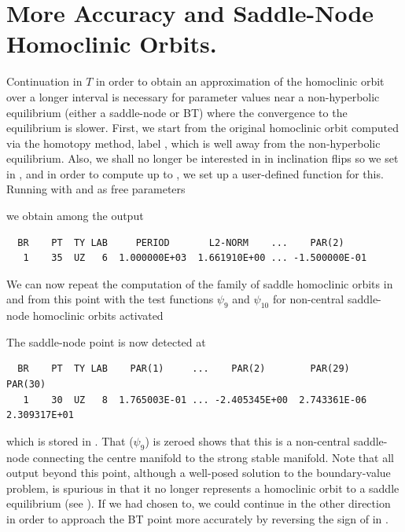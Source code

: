 \documentclass[12pt]{report}
\begin{document}
\section{More Accuracy and Saddle-Node Homoclinic Orbits.}
Continuation in $T$ 
in order to obtain an approximation of the homoclinic orbit over a
longer interval is necessary for parameter values near a non-hyperbolic
equilibrium (either a saddle-node or BT) where the convergence
to the equilibrium is slower. 
First, we start from the original homoclinic orbit computed
via the homotopy method, label , which is well away from
the non-hyperbolic equilibrium.
Also, we shall no longer be interested in
in inclination flips so we set  in ,
and in order to compute up to , we set up a
user-defined function for this. Running \AUTO with  and 
 as free parameters
\begin{center}
\end{center}
we obtain among the output
\begin{verbatim}
  BR    PT  TY LAB     PERIOD       L2-NORM    ...    PAR(2)     
   1    35  UZ   6  1.000000E+03  1.661910E+00 ... -1.500000E-01
\end{verbatim}

We can now repeat the computation of the family of saddle homoclinic
orbits in  and  from this point with
the test functions $\psi_9$ and $\psi_{10}$ for non-central
saddle-node homoclinic orbits activated 
\begin{center}
\end{center}
The saddle-node point is now detected at 
\begin{verbatim} 
  BR    PT  TY LAB    PAR(1)     ...    PAR(2)        PAR(29)       PAR(30)
   1    30  UZ   8  1.765003E-01 ... -2.405345E+00  2.743361E-06  2.309317E+01
\end{verbatim}
which is stored in .
That  ($\psi_9$) is zeroed shows that this
is a non-central saddle-node connecting the centre manifold to the strong stable
manifold. Note that all output beyond this point, although a well-posed
solution to the boundary-value problem, is spurious in that it no longer
represents a homoclinic orbit to a saddle equilibrium (see
). If we had chosen
to, we could continue in the other direction in order to
approach the BT point more accurately by reversing the sign of
 in .
 
\end{document}

